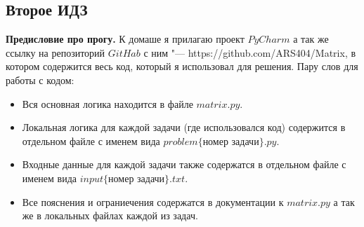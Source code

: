 \subsection{Второе ИДЗ}

\textbf{Предисловие про прогу.} К домаше я прилагаю проект $PyCharm$ а так же ссылку на репозиторий $GitHab$ с ним "--- https://github.com/ARS404/Matrix, в котором содержится весь код, который я использовал для решения. Пару слов для работы с кодом:
\begin{itemize}
    \item Вся основная логика находится в файле $matrix.py$.
    \item Локальная логика для каждой задачи (где использовался код) содержится в отдельном файле с именем вида $problem\{\textit{номер задачи}\}.py$.
    \item Входные данные для каждой задачи также содержатся в отдельном файле с именем вида $input\{\textit{номер задачи}\}.txt$.
    \item Все пояснения и ограниечения содержатся в документации к $matrix.py$ а так же в локальных файлах каждой из задач.
\end{itemize}

